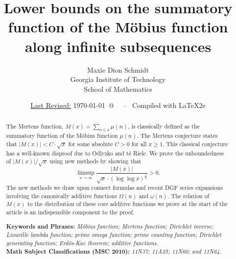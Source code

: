 \documentclass[11pt,reqno,a4letter]{article}
\title{
       \LARGE{
       Lower bounds on the summatory function of the M\"obius function along infinite subsequences 
       } 
}
\author{{\Large Maxie Dion Schmidt} \\ 
        {\normalsize Georgia Institute of Technology} \\[0.025cm] 
        {\normalsize School of Mathematics} 
}
\date{\small\underline{Last Revised:} \today \ @\ \hhmmsstime{} \ -- \ Compiled with \LaTeX2e}
\numberwithin{figure}{section}
\numberwithin{table}{section}
\theoremstyle{plain}
\numberwithin{theorem}{section}
\theoremstyle{definition}
\begin{document}
 

\maketitle

\begin{abstract} 
The Mertens function, $M(x) = \sum_{n \leq x} \mu(n)$, is classically 
defined as the summatory function of the M\"obius function $\mu(n)$. 
The Mertens conjecture states that $|M(x)| < C \cdot \sqrt{x}$ for some absolute $C > 0$ for all 
$x \geq 1$. 
This classical conjecture has a well-known disproof due to 
Odlyzko and t\'{e} Riele. 
We prove the unboundedness of $|M(x)| / \sqrt{x}$ using new methods by showing that 
$$\limsup_{x \rightarrow \infty} \frac{|M(x)|}{\sqrt{x} \cdot (\log\log x)^{\frac{1}{2}}} > 0.$$ 
The new methods we draw upon connect formulas and recent DGF series expansions involving the canonically 
additive functions $\Omega(n)$ and $\omega(n)$. 
The relation of $M(x)$ to the distribution of these core additive functions 
we prove at the start of the article is an indispensible component to the proof. 

\bigskip 
\noindent
\textbf{Keywords and Phrases:} {\it M\"obius function; Mertens function; 
                                    Dirichlet inverse; Liouville lambda function; prime omega function; 
                                    prime counting function; Dirichlet generating function; 
                                    Erd\"os-Kac theorem; additive functions. } \\ 
\textbf{Math Subject Classifications (MSC 2010):} {\it 11N37; 11A25; 11N60; and 11N64. } 
\end{abstract} 
\end{document}
